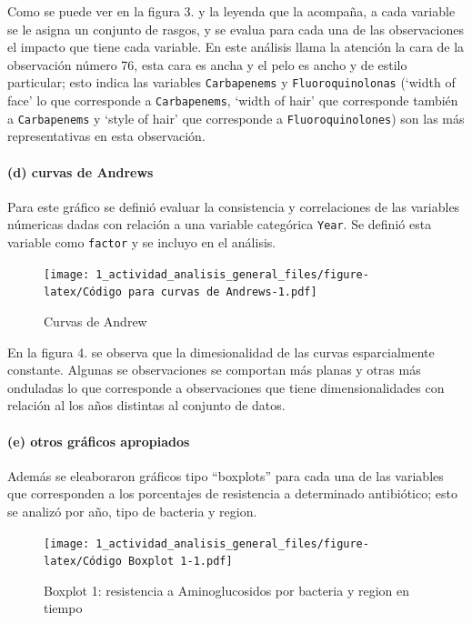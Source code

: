 \documentclass[
]{article}
\begin{document}
Como se puede ver en la figura 3. y la leyenda que la acompaña, a cada
variable se le asigna un conjunto de rasgos, y se evalua para cada una
de las observaciones el impacto que tiene cada variable. En este
análisis llama la atención la cara de la observación número 76, esta
cara es ancha y el pelo es ancho y de estilo particular; esto indica las
variables \texttt{Carbapenems} y \texttt{Fluoroquinolonas} (`width of
face' lo que corresponde a \texttt{Carbapenems}, `width of hair' que
corresponde también a \texttt{Carbapenems} y `style of hair' que
corresponde a \texttt{Fluoroquinolones}) son las más representativas en
esta observación.

\hypertarget{d-curvas-de-andrews}{%
\paragraph{(d) curvas de Andrews}\label{d-curvas-de-andrews}}

Para este gráfico se definió evaluar la consistencia y correlaciones de
las variables númericas dadas con relación a una variable categórica
\texttt{Year}. Se definió esta variable como \texttt{factor} y se
incluyo en el análisis.

\begin{figure}
\centering
\texttt{[image: 1\_actividad\_analisis\_general\_files/figure-latex/Código para curvas de Andrews-1.pdf]}
\caption{Curvas de Andrew}
\end{figure}

En la figura 4. se observa que la dimesionalidad de las curvas
esparcialmente constante. Algunas se observaciones se comportan más
planas y otras más onduladas lo que corresponde a observaciones que
tiene dimensionalidades con relación al los años distintas al conjunto
de datos.

\hypertarget{e-otros-gruxe1ficos-apropiados}{%
\paragraph{(e) otros gráficos
apropiados}\label{e-otros-gruxe1ficos-apropiados}}

Además se eleaboraron gráficos tipo ``boxplots'' para cada una de las
variables que corresponden a los porcentajes de resistencia a
determinado antibiótico; esto se analizó por año, tipo de bacteria y
region.

\begin{figure}
\centering
\texttt{[image: 1\_actividad\_analisis\_general\_files/figure-latex/Código Boxplot 1-1.pdf]}
\caption{Boxplot 1: resistencia a Aminoglucosidos por bacteria y region
en tiempo}
\end{figure}
\end{document}
